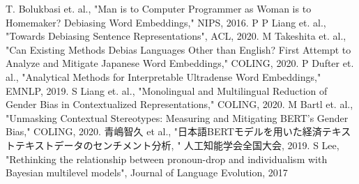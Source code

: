 \documentclass[a4j,10pt, twocolumn]{jarticle} \usepackage[dvipdfmx]{graphicx} \usepackage{amssymb} \usepackage{amsmath}
\begin{document}
\begin{thebibliography}{6}
{\footnotesize
{}
T. Bolukbasi et. al., "Man is to Computer Programmer as Woman is to Homemaker? Debiasing Word Embeddings," NIPS, 2016.
P P Liang et. al., "Towards Debiasing Sentence Representations", ACL, 2020.
M Takeshita et. al., "Can Existing Methods Debias Languages Other than English?
First Attempt to Analyze and Mitigate Japanese Word Embeddings," COLING, 2020.
P Dufter et. al., "Analytical Methods for Interpretable Ultradense Word Embeddings," EMNLP, 2019.
S Liang et. al., "Monolingual and Multilingual Reduction of Gender Bias in Contextualized Representations," COLING, 2020.
M Bartl et. al., "Unmasking Contextual Stereotypes:
Measuring and Mitigating BERT’s Gender Bias," COLING, 2020.
青嶋智久 et al., "日本語BERTモデルを用いた経済テキストテキストデータのセンチメント分析, " 人工知能学会全国大会, 2019.
S Lee, "Rethinking the relationship between pronoun-drop and individualism with Bayesian multilevel models", Journal of Language Evolution, 2017
}
\end{thebibliography}
\end{document}
